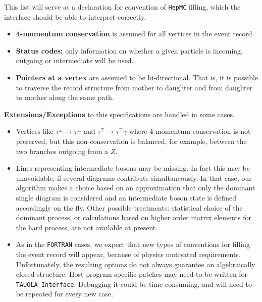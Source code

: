 \documentclass[]{Tauola_interface_design}
\begin{document}
This list will serve as a declaration for convention of  {\tt HepMC} filling, which  the 
interface should  be able to interpret correctly.

\begin{itemize}
  \item \textbf{4-momentum conservation} is assumed for all vertices in the event record.
  \item \textbf{Status codes:} only information on whether a given particle is incoming, outgoing or intermediate will be used.
  \item \textbf{Pointers at a vertex} are assumed to be bi-directional. That is, it is possible to traverse the record structure from mother to daughter and from daughter to mother along the same path.
\end{itemize}

\noindent
\textbf{ Extensions/Exceptions} to this specifications  are handled in some cases. 

  \begin{itemize} 
    \item  Vertices like $\tau^\pm \rightarrow \tau^\pm$ and $\tau^\mp \rightarrow \tau^\mp \gamma$ 
           where 4-momentum conservation is not preserved, but this
           non-conservation is balanced, for example, between the two branches
outgoing from a $Z$. 
    \item  Lines representing
           intermediate bosons may be missing. In fact this may be unavoidable, if several 
           diagrams contribute simultaneously. In that case, our algorithm makes a choice
           based on an approximation that
           only the dominant  single diagram is considered
           and an intermediate boson state is defined accordingly on the fly. Other possible treatments:
           statistical choice of the dominant process, or calculations based on higher order
           matrix elements for the hard process, are not available at present.
    \item
           As in the {\tt FORTRAN} cases, we expect that  new  types of 
           conventions for filling the event record
           will appear, because of physics motivated requirements.
           Unfortunately, the resulting options do not always guarantee
           an algebraically closed structure.  
           Host program specific patches  may need to be written for  
           {\tt TAUOLA Interface}. 
           Debugging it could be time consuming, and will need to be repeated for every new
           case.
   \end{itemize}
\end{document}
